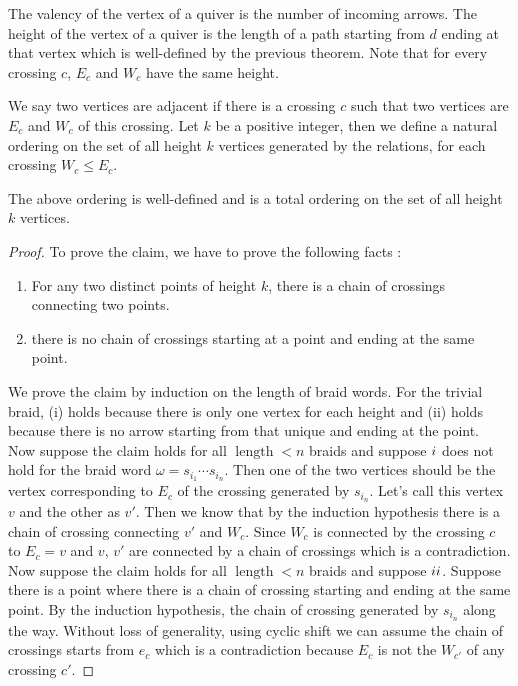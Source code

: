 \begin{definition}
 The valency of the vertex of a quiver is the number of incoming arrows. The height of the vertex of a quiver is the length of a path starting from $d$ ending at that vertex which is well-defined by the previous theorem. Note that for every crossing $c$, $E_c$ and $W_c$ have the same height. 
\end{definition}

\begin{definition}
 We say two vertices are adjacent if there is a crossing $c$ such that two vertices are $E_c$ and $W_c$ of this crossing. Let $k$ be a positive integer, then we define a natural ordering on the set of all height $k$ vertices generated by the relations, for each crossing $W_c \leq E_c $.
 
\end{definition}

\begin{theorem}\label{quoted1}
	The above ordering is well-defined and is a total ordering on the set of all height $k$ vertices.
\end{theorem}

\begin{proof} 
To prove the claim, we have to prove the following facts :
\begin{enumerate}[label=(\roman*)]
	\item For any two distinct points of height $k$, there is a chain of crossings connecting two points.
	\item there is no chain of crossings starting at a point and ending at the same point.
\end{enumerate}
We prove the claim by induction on the length of braid words. For the trivial braid, (\Rn{1}) holds because there is only one vertex for each height and (\Rn{2}) holds because there is no arrow starting from that unique and ending at the point.\\
 Now suppose the claim holds for all $\operatorname{length} < n$ braids and suppose $\Rn{1}$ does not hold for the braid word $\omega = s_{i_1}\cdots s_{i_n}$. Then one of the two vertices should be the vertex corresponding to $E_c$ of the crossing generated by $s_{i_n}$. Let's call this vertex $v$ and the other as $v'$. Then we know that by the induction hypothesis there is a chain of crossing connecting $v'$ and $W_c$. Since $W_c$ is connected by the crossing $c$ to $E_c = v$ and $v$, $v'$ are connected by a chain of crossings which is a contradiction. \\
 Now suppose the claim holds for all $\operatorname{length} < n$ braids and suppose $\Rn{2}$. Suppose there is a point where there is a chain of crossing starting and ending at the same point. By the induction hypothesis, the chain of crossing generated by $s_{i_n}$ along the way. Without loss of generality, using cyclic shift we can assume the chain of crossings starts from $e_c$ which is a contradiction because $E_c$ is not the $W_{c'}$ of any crossing $c'$.
\end{proof}


